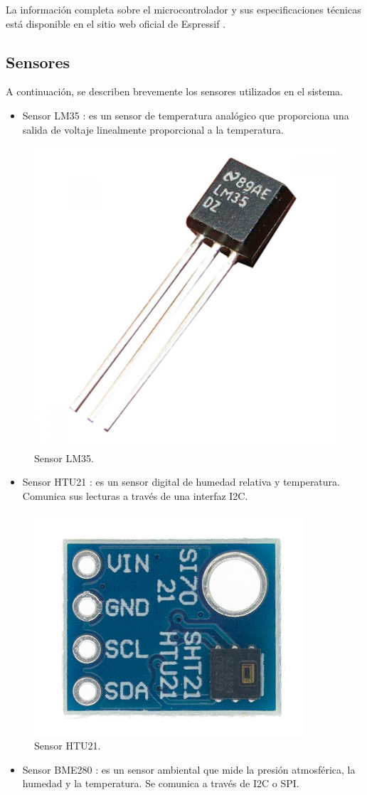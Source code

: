 La información completa sobre el microcontrolador y sus especificaciones técnicas está disponible en el sitio web oficial de Espressif \citep{docsesp32c3}.

\subsection{Sensores}

A continuación, se describen brevemente los sensores utilizados en el sistema.

\begin{itemize}
    \item Sensor LM35 \citep{sensor_lm35}: es un sensor de temperatura analógico que proporciona una salida de voltaje linealmente proporcional a la temperatura.
\end{itemize}

\begin{figure}[H]
	\centering
	\includegraphics[width=.2\textwidth]{./Figures/sensor_lm35.png}
	\caption{Sensor LM35.}
	\label{fig:lm35}
\end{figure}

\begin{itemize}
	\item Sensor HTU21 \citep{sensor_htu21}: es un sensor digital de humedad relativa y temperatura. Comunica sus lecturas a través de una interfaz I2C.
\end{itemize}

\begin{figure}[H]
    \centering
    \includegraphics[width=.2\textwidth]{./Figures/sensor_htu21.png}
    \caption{Sensor HTU21.}
    \label{fig:htu21}
\end{figure}

\begin{itemize}
	\item Sensor BME280 \citep{sensor_bme280}: es un sensor ambiental que mide la presión atmosférica, la humedad y la temperatura. Se comunica a través de I2C o SPI.
\end{itemize}

